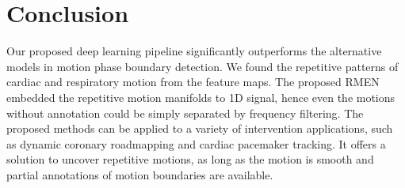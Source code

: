 \documentclass{article}
\begin{document}
\section{Conclusion}
Our proposed deep learning pipeline significantly outperforms the alternative models in motion phase boundary detection. We found the repetitive patterns of cardiac and respiratory motion from the feature maps. The proposed RMEN embedded the repetitive motion manifolds to 1D signal, hence even the motions without annotation could be simply separated by frequency filtering. The proposed methods can be applied to a variety of intervention applications, such as dynamic coronary roadmapping and cardiac pacemaker tracking. It offers a solution to uncover repetitive motions, as long as the motion is smooth and partial annotations of motion boundaries are available. 



\end{document}
